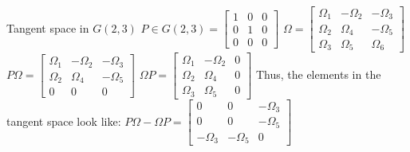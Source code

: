 \documentclass[11pt,a4paper]{report}
\begin{document}
\begin{Ex}{Tangent space in $G(2,3)$}
   $P \in G(2,3) = \begin{bmatrix} 1 & 0 & 0 \\ 0 & 1 & 0 \\ 0 & 0 & 0  \end{bmatrix} $
   $ \Omega = \begin{bmatrix} \Omega_1 & -\Omega_2 & -\Omega_3 \\ \Omega_2 & \Omega_4 & -\Omega_5 \\ \Omega_3 & \Omega_5 & \Omega_6 \end{bmatrix}$
   $ P \Omega = \begin{bmatrix} \Omega_1 & - \Omega_2 & - \Omega_3 \\ \Omega_2 & \Omega_4 & - \Omega_5 \\ 0 & 0 & 0 \end{bmatrix}$
   $ \Omega P = \begin{bmatrix} \Omega_1 & - \Omega_2 & 0 \\ \Omega_2 & \Omega_4 & 0 \\ \Omega_3 & \Omega_5 & 0 \end{bmatrix}$
   Thus, the elements in the tangent space look like:
   $P \Omega - \Omega P = \begin{bmatrix} 0 & 0 & -\Omega_3 \\ 0 & 0 & -\Omega_5 \\ -\Omega_3 & - \Omega_5 & 0 \end{bmatrix} $
\end{Ex}
\end{document}
